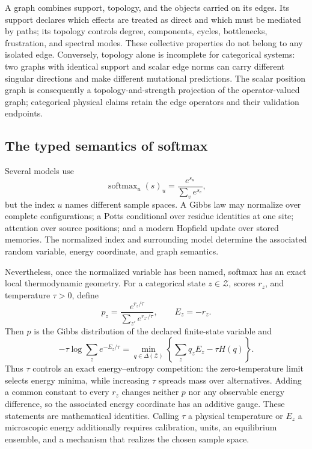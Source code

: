 \documentclass[10pt]{article}
\theoremstyle{definition}
\theoremstyle{remark}
\newcommand{\BookSection}[1]{\subsection{#1}}
\begin{document}
A graph combines support, topology, and the objects carried on its edges.  Its support declares
which effects are treated as direct and which must be mediated by paths; its topology controls degree,
components, cycles, bottlenecks, frustration, and spectral modes.  These collective properties do
not belong to any isolated edge.  Conversely, topology alone is incomplete for categorical
systems: two graphs with identical support and scalar edge norms can carry different singular
directions and make different mutational predictions.  The scalar position graph is consequently
a topology-and-strength projection of the operator-valued graph; categorical physical claims retain
the edge operators and their validation endpoints.

\BookSection{The typed semantics of softmax}

Several models use
\begin{equation}
\operatorname{softmax}_{u}(s)_u
=\frac{e^{s_u}}{\sum_v e^{s_v}},
\label{eq:generic-softmax}
\end{equation}
but the index $u$ names different sample spaces.  A Gibbs law may normalize over complete
configurations; a Potts conditional over residue identities at one site; attention over source
positions; and a modern Hopfield update over stored memories.  The normalized index and surrounding
model determine the associated random variable, energy coordinate, and graph semantics.

Nevertheless, once the normalized variable has been named, softmax has an exact local
thermodynamic geometry.  For a categorical state $z\in\mathcal Z$, scores $r_z$, and temperature
$\tau>0$, define
\begin{equation}
p_z=\frac{e^{r_z/\tau}}{\sum_{z'}e^{r_{z'}/\tau}},
\qquad E_z=-r_z.
\label{eq:local-gibbs-softmax}
\end{equation}
Then $p$ is the Gibbs distribution of the declared finite-state variable and
\begin{equation}
-\tau\log\sum_z e^{-E_z/\tau}
=\min_{q\in\Delta(\mathcal Z)}
\left\{\sum_z q_zE_z-\tau H(q)\right\}.
\label{eq:softmax-free-energy}
\end{equation}
Thus $\tau$ controls an exact energy--entropy competition: the zero-temperature limit selects
energy minima, while increasing $\tau$ spreads mass over alternatives.  Adding a common constant
to every $r_z$ changes neither $p$ nor any observable energy difference, so the associated energy
coordinate has an additive gauge.  These statements are mathematical identities.  Calling
$\tau$ a physical temperature or $E_z$ a microscopic energy additionally requires calibration,
units, an equilibrium ensemble, and a mechanism that realizes the chosen sample space.
\end{document}
